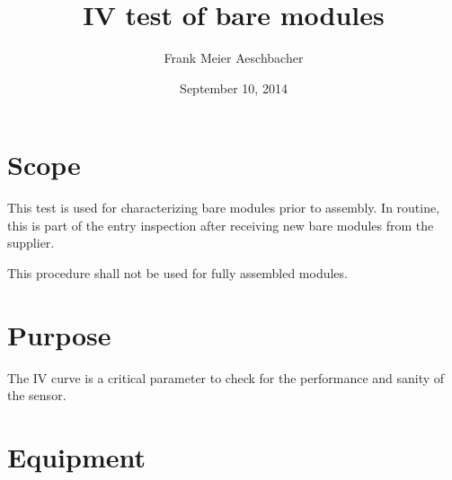 \documentclass[10pt]{unlsilabsop}
\title{IV test of bare modules}
\date{September 10, 2014}
\author{Frank Meier Aeschbacher}
\begin{document}
\maketitle

\section{Scope}
This test is used for characterizing bare modules prior to assembly. In routine, this is part of the entry inspection after receiving new bare modules from the supplier.

This procedure shall not be used for fully assembled modules.

\section{Purpose}
The IV curve is a critical parameter to check for the performance and sanity of the sensor.



\section{Equipment}
\end{document}
